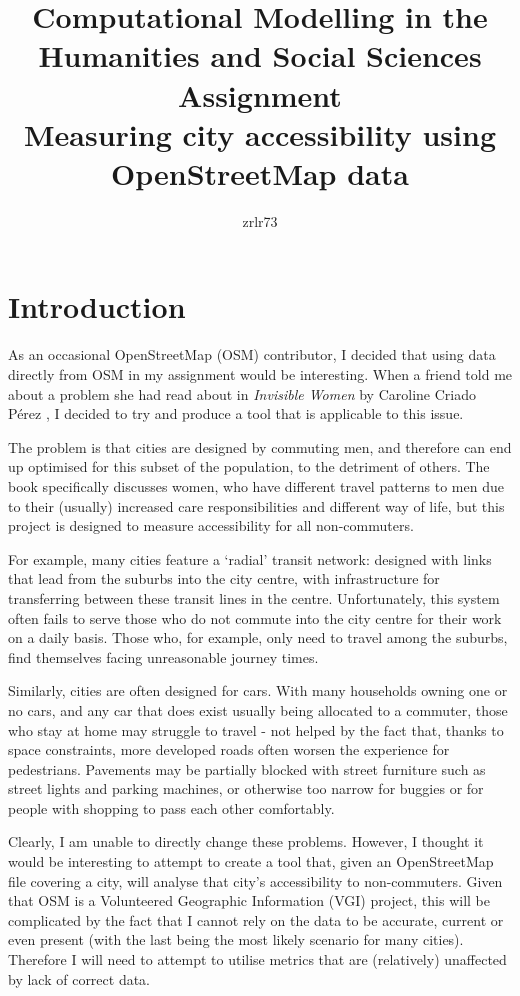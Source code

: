 \documentclass[12pt]{article} %
\title{\vspace{-1.6cm}Computational Modelling in the Humanities and Social Sciences Assignment \\
	\vspace{0.5cm}\large Measuring city accessibility using OpenStreetMap data\vspace{-0.3cm}}
\author{zrlr73}
\date{} %
\begin{document}
\maketitle

\section{Introduction}

As an occasional OpenStreetMap (OSM) contributor, I decided that using data directly from OSM in my assignment would be interesting. When a friend told me about a problem she had read about in \textit{Invisible Women} by Caroline Criado Pérez \citeyearpar{Perez2019}, I decided to try and produce a tool that is applicable to this issue.

The problem is that cities are designed by commuting men, and therefore can end up optimised for this subset of the population, to the detriment of others. The book specifically discusses women, who have different travel patterns to men due to their (usually) increased care responsibilities and different way of life, but this project is designed to measure accessibility for all non-commuters.

For example, many cities feature a `radial' transit network: designed with links that lead from the suburbs into the city centre, with infrastructure for transferring between these transit lines in the centre. Unfortunately, this system often fails to serve those who do not commute into the city centre for their work on a daily basis. Those who, for example, only need to travel among the suburbs, find themselves facing unreasonable journey times.

Similarly, cities are often designed for cars. With many households owning one or no cars, and any car that does exist usually being allocated to a commuter, those who stay at home may struggle to travel - not helped by the fact that, thanks to space constraints, more developed roads often worsen the experience for pedestrians. Pavements may be partially blocked with street furniture such as street lights and parking machines, or otherwise too narrow for buggies or for people with shopping to pass each other comfortably.

Clearly, I am unable to directly change these problems. However, I thought it would be interesting to attempt to create a tool that, given an OpenStreetMap file covering a city, will analyse that city's accessibility to non-commuters. Given that OSM is a Volunteered Geographic Information (VGI) project, this will be complicated by the fact that I cannot rely on the data to be accurate, current or even present (with the last being the most likely scenario for many cities). Therefore I will need to attempt to utilise metrics that are (relatively) unaffected by lack of correct data.
\end{document}
